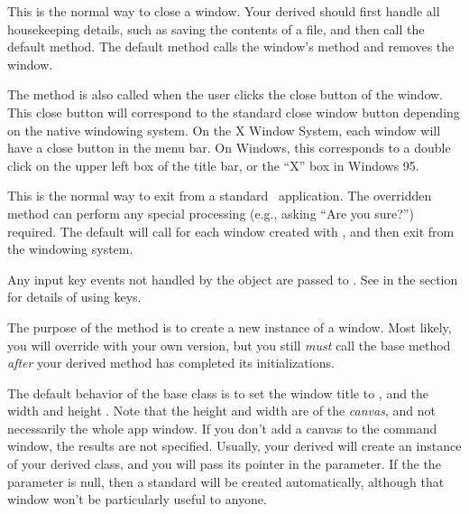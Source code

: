 \normalfont\normalsize


This is the normal way to close a window. Your derived 
should first handle all housekeeping details, such as saving the
contents of a file, and then call the default 
method. The default method calls the window's 
method and removes the window.

The  method is also called when the user clicks
the close button of the window.  This close button will
correspond to the standard close window button depending on the
native windowing system. On the X Window System, each window will
have a close button in the menu bar. On Windows, this corresponds
to a double click on the upper left box of the title bar, or
the ``X'' box in Windows 95.


This is the normal way to exit from a standard \V\ application. The
overridden method can perform any special processing (e.g.,
asking ``Are you sure?'') required. The default  will
call  for each window created with ,
and then exit from the windowing system.


Any input key events not handled by the  object are
passed to . See  in the 
section for details of using keys.


The purpose of the  method is to create a
new instance of a window. Most likely, you will override
 with your own version, but you still \emph{must}
call the base  method \emph{after} your
derived method has completed its initializations.

The default behavior of the base  class is to set
the window title to , and the width  and
height . Note that the height and width are of the
\emph{canvas}, and not necessarily the whole app window. If you
don't add a canvas to the command window, the results are not
specified. Usually, your derived  will create an
instance of your derived  class, and you will
pass its pointer in the  parameter. If the the 
parameter is null, then a standard  will be
created automatically, although that window won't be particularly
useful to anyone.

